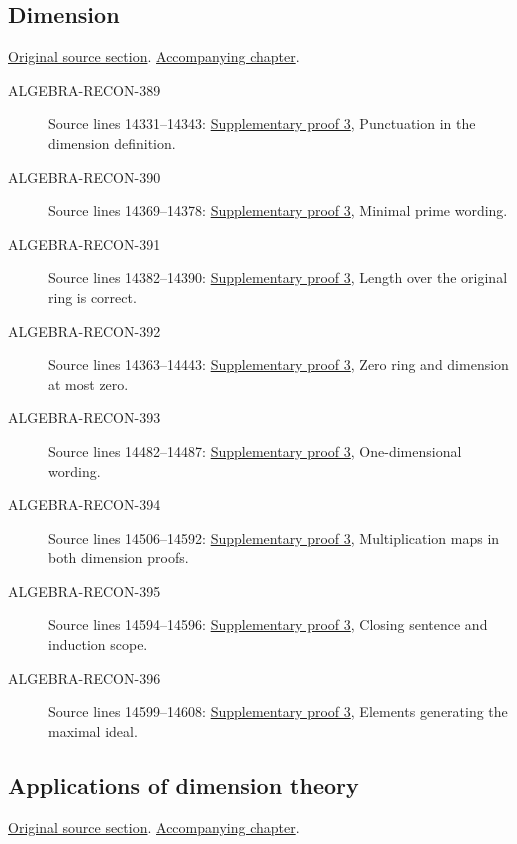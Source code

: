 \subsection{Dimension}
\hypertarget{algebra-source-section-dimension}{}
\noindent\href{https://github.com/stacks/stacks-project/blob/a04446e57ec1fbc252a871afcec7752fb2807b14/algebra.tex\#L14305}{Original source section}. \href{algebra.pdf\#nameddest=section-dimension}{Accompanying chapter}.

\begin{description}
\item[ALGEBRA-RECON-389] Source lines 14331--14343: \hyperlink{algebra_local_hilbert_dimension_notes_20260927}{Supplementary proof 3}, Punctuation in the dimension definition.
\item[ALGEBRA-RECON-390] Source lines 14369--14378: \hyperlink{algebra_local_hilbert_dimension_notes_20260927}{Supplementary proof 3}, Minimal prime wording.
\item[ALGEBRA-RECON-391] Source lines 14382--14390: \hyperlink{algebra_local_hilbert_dimension_notes_20260927}{Supplementary proof 3}, Length over the original ring is correct.
\item[ALGEBRA-RECON-392] Source lines 14363--14443: \hyperlink{algebra_local_hilbert_dimension_notes_20260927}{Supplementary proof 3}, Zero ring and dimension at most zero.
\item[ALGEBRA-RECON-393] Source lines 14482--14487: \hyperlink{algebra_local_hilbert_dimension_notes_20260927}{Supplementary proof 3}, One-dimensional wording.
\item[ALGEBRA-RECON-394] Source lines 14506--14592: \hyperlink{algebra_local_hilbert_dimension_notes_20260927}{Supplementary proof 3}, Multiplication maps in both dimension proofs.
\item[ALGEBRA-RECON-395] Source lines 14594--14596: \hyperlink{algebra_local_hilbert_dimension_notes_20260927}{Supplementary proof 3}, Closing sentence and induction scope.
\item[ALGEBRA-RECON-396] Source lines 14599--14608: \hyperlink{algebra_local_hilbert_dimension_notes_20260927}{Supplementary proof 3}, Elements generating the maximal ideal.
\end{description}

\subsection{Applications of dimension theory}
\hypertarget{algebra-source-section-applications-dimension-theory}{}
\noindent\href{https://github.com/stacks/stacks-project/blob/a04446e57ec1fbc252a871afcec7752fb2807b14/algebra.tex\#L14731}{Original source section}. \href{algebra.pdf\#nameddest=section-applications-dimension-theory}{Accompanying chapter}.


